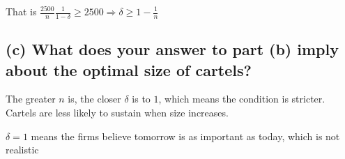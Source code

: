 \documentclass{article}
\begin{document}
That is $\frac {2500}{n} \frac{1}{1-\delta} \ge 2500 \Rightarrow \delta \ge 1 -\frac{1}{n}$

\subsection*{(c) What does your answer to part (b) imply about the optimal size of cartels?}

The greater $n$ is, the closer $\delta$ is to $1$, which means the condition is stricter. Cartels are less likely to sustain when size increases.

\begin{mdframed}[backgroundcolor=blue!20,linecolor=white]
$\delta = 1$ means the firms believe tomorrow is as important as today, which is not realistic
\end{mdframed}
\end{document}
